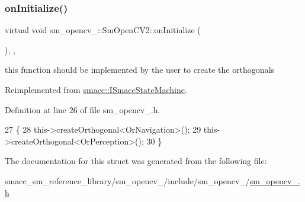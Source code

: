 \subsubsection{\texorpdfstring{on\+Initialize()}{onInitialize()}}
{\footnotesize\ttfamily virtual void sm\+\_\+opencv\+\_\+::\+Sm\+Open\+C\+V2\+::on\+Initialize (\begin{DoxyParamCaption}{ }\end{DoxyParamCaption})\hspace{0.3cm}{\ttfamily [inline]}, {\ttfamily [override]}, {\ttfamily [virtual]}}



this function should be implemented by the user to create the orthogonals 



Reimplemented from \hyperlink{classsmacc_1_1ISmaccStateMachine_ac2982c6c8283663e5e1e8a7c82f511ec}{smacc\+::\+I\+Smacc\+State\+Machine}.



Definition at line 26 of file sm\+\_\+opencv\+\_.\+h.


\begin{DoxyCode}
27     \{
28         this->createOrthogonal<OrNavigation>();
29         this->createOrthogonal<OrPerception>();
30     \}
\end{DoxyCode}


The documentation for this struct was generated from the following file\+:\begin{DoxyCompactItemize}
\item 
smacc\+\_\+sm\+\_\+reference\+\_\+library/sm\+\_\+opencv\+\_/include/sm\+\_\+opencv\+\_/\hyperlink{sm__opencv__2_8h}{sm\+\_\+opencv\+\_.\+h}\end{DoxyCompactItemize}
